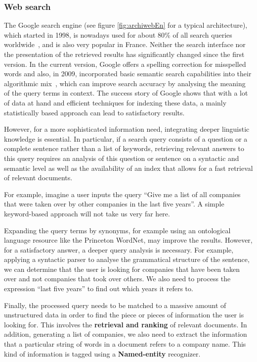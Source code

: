 \begin{multicols}{2}
\subsubsection{Web search}
The Google search engine (see figure \ref{fig:archiwebEn} for a
typical architecture), which started in 1998, is nowadays used for
about 80\% of all search queries worldwide~\cite{googleworld}, and is
also very popular in France. Neither the search interface nor the
presentation of the retrieved results has significantly changed since
the first version. In the current version, Google offers a spelling
correction for misspelled words and also, in 2009, incorporated basic
semantic search capabilities into their algorithmic mix~\cite{googlesemantics}, which can
improve search accuracy by analysing the meaning of the query terms in
context. The success story of Google shows that with a lot of data at
hand and efficient techniques for indexing these data, a mainly
statistically based approach can lead to satisfactory results.

However, for a more sophisticated information need, integrating deeper
linguistic knowledge is essential. In particular, if a search query
consists of a question or a complete sentence rather than a list of
keywords, retrieving relevant answers to this query requires an
analysis of this question or sentence on a syntactic and semantic
level as well as the availability of an index that allows for a fast
retrieval of relevant documents.



For example, imagine a user inputs the query ``Give me a list of all
companies that were taken over by other companies in the last five
years''. A simple keyword-based approach will not take us very far
here.

Expanding the query terms by synonyms, for example using an
ontological language resource like the Princeton WordNet, may improve
the results. However, for a satisfactory answer, a deeper query
analysis is necessary. For example, applying a syntactic parser to
analyse the grammatical structure of the sentence, we can determine
that the user is looking for companies that have been taken over and
not companies that took over others. We also need to process the
expression ``last five years'' to find out which years it refers to.

Finally, the processed query needs to be matched to a massive amount
of unstructured data in order to find the piece or pieces of
information the user is looking for. This involves the {\bf retrieval and
ranking} of relevant documents. In addition, generating a list of
companies, we also need to extract the information that a particular
string of words in a document refers to a company name. This kind of
information is tagged using a {\bf Named-entity} recognizer.


\end{multicols}
